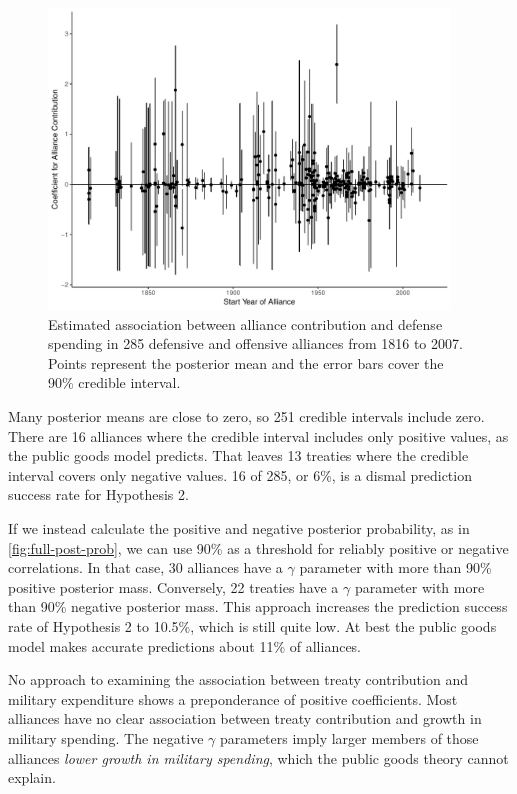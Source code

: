 \documentclass[12pt]{article}
\begin{document}
\begin{figure}[htbp]
	\centering
		\includegraphics[width=0.95\textwidth]{alliance-coefs-year.pdf}
	\caption{Estimated association between alliance contribution and defense spending in 285 defensive and offensive alliances from 1816 to 2007. Points represent the posterior mean and the error bars cover the 90\% credible interval.}
	\label{fig:alliance-coefs-year}
\end{figure}


Many posterior means are close to zero, so 251 credible intervals include zero. 
There are 16 alliances where the credible interval includes only positive values, as the public goods model predicts. 
That leaves 13 treaties where the credible interval covers only negative values.
16 of 285, or 6\%, is a dismal prediction success rate for Hypothesis 2. 


If we instead calculate the positive and negative posterior probability, as in \autoref{fig:full-post-prob}, we can use 90\% as a threshold for reliably positive or negative correlations. 
In that case, 30 alliances have a $\gamma$ parameter with more than 90\% positive posterior mass. 
Conversely, 22 treaties have a $\gamma$ parameter with more than 90\% negative posterior mass. 
This approach increases the prediction success rate of Hypothesis 2 to 10.5\%, which is still quite low. 
At best the public goods model makes accurate predictions about 11\% of alliances. 
 

No approach to examining the association between treaty contribution and military expenditure shows a preponderance of positive coefficients. 
Most alliances have no clear association between treaty contribution and growth in military spending.
The negative $\gamma$ parameters imply larger members of those alliances \emph{lower growth in military spending}, which the public goods theory cannot explain. 
\end{document}

